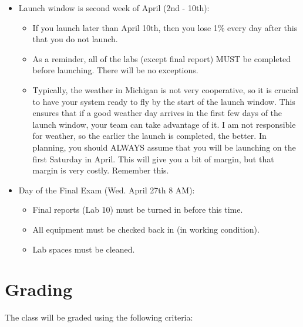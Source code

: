 \documentclass[11pt]{article}
\begin{document}
\begin{itemize}
\item Launch window is second week of April (2nd - 10th):
  \begin{itemize}
    \item If you launch later than April 10th, then you lose 1\% every
      day after this that you do not launch.
    \item As a reminder, all of the labs (except final report) MUST be
      completed before launching. There will be no exceptions.
    \item Typically, the weather in Michigan is not very cooperative,
      so it is crucial to have your system ready to fly by the start
      of the launch window. This ensures that if a good weather day
      arrives in the first few days of the launch window, your team
      can take advantage of it. I am not responsible for weather, so
      the earlier the launch is completed, the better. In planning,
      you should ALWAYS assume that you will be launching on the first
      Saturday in April. This will give you a bit of margin, but that
      margin is very costly. Remember this.
  \end{itemize}
        
\item Day of the Final Exam (Wed. April 27th 8 AM):
  \begin{itemize}
    \item Final reports (Lab 10) must be turned in before this time.
    \item All equipment must be checked back in (in working condition).
    \item Lab spaces must be cleaned.
  \end{itemize}
\end{itemize}

\section{Grading}

The class will be graded using the following criteria:
\end{document}
